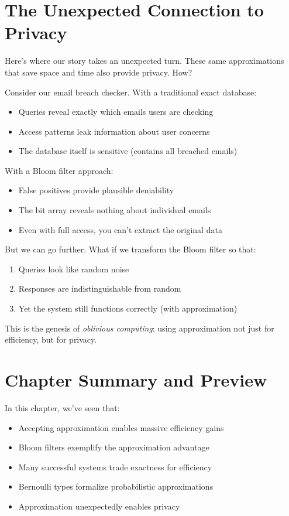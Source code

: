 \section{The Unexpected Connection to Privacy}

Here's where our story takes an unexpected turn. These same approximations that save space and time also provide privacy. How?

Consider our email breach checker. With a traditional exact database:
\begin{itemize}
    \item Queries reveal exactly which emails users are checking
    \item Access patterns leak information about user concerns
    \item The database itself is sensitive (contains all breached emails)
\end{itemize}

With a Bloom filter approach:
\begin{itemize}
    \item False positives provide plausible deniability
    \item The bit array reveals nothing about individual emails
    \item Even with full access, you can't extract the original data
\end{itemize}

But we can go further. What if we transform the Bloom filter so that:
\begin{enumerate}
    \item Queries look like random noise
    \item Responses are indistinguishable from random
    \item Yet the system still functions correctly (with approximation)
\end{enumerate}

This is the genesis of \emph{oblivious computing}: using approximation not just for efficiency, but for privacy.

\section{Chapter Summary and Preview}

In this chapter, we've seen that:
\begin{itemize}
    \item Accepting approximation enables massive efficiency gains
    \item Bloom filters exemplify the approximation advantage
    \item Many successful systems trade exactness for efficiency
    \item Bernoulli types formalize probabilistic approximations
    \item Approximation unexpectedly enables privacy
\end{itemize}


